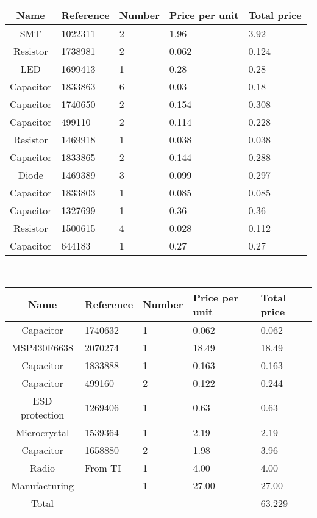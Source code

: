 \begin{tabular}{| c |l | l | l | l |} 
	\hline
		Name & Reference & Number & Price per unit & Total price\\ \hline
		SMT & 1022311 & 2 & 1.96 & 3.92\\ \hline
		Resistor & 1738981 & 2 & 0.062 & 0.124\\ \hline
		LED & 1699413 & 1 & 0.28 & 0.28\\ \hline
		Capacitor & 1833863 & 6 & 0.03 & 0.18\\ \hline
		Capacitor & 1740650 & 2 & 0.154 & 0.308\\ \hline
		Capacitor & 499110 & 2 & 0.114 & 0.228\\ \hline
		Resistor & 1469918 & 1 & 0.038 & 0.038\\ \hline
		Capacitor & 1833865 & 2 & 0.144 & 0.288\\ \hline
		Diode & 1469389 & 3 & 0.099 & 0.297\\ \hline
	   	Capacitor & 1833803 & 1 & 0.085 & 0.085\\ \hline
 		Capacitor & 1327699 & 1 & 0.36 & 0.36 \\ \hline
  		Resistor & 1500615 & 4 & 0.028 & 0.112\\ \hline
	 	Capacitor & 644183 & 1 & 0.27 & 0.27 \\ \hline
\end{tabular}\\
\begin{tabular}{| c |l | l | l | l |} 
		\hline
		Name & Reference & Number & Price per unit & Total price\\ \hline
	 	Capacitor & 1740632 & 1 & 0.062 & 0.062\\ \hline
	 	MSP430F6638 & 2070274 & 1 & 18.49 & 18.49\\ \hline
	 	Capacitor & 1833888 & 1 & 0.163 & 0.163\\ \hline
	 	Capacitor & 499160 & 2 & 0.122 & 0.244\\ \hline
	 	ESD protection & 1269406 & 1 & 0.63 & 0.63\\ \hline
	 	Microcrystal & 1539364 & 1 & 2.19 & 2.19\\ \hline
	 	Capacitor & 1658880 & 2 & 1.98 & 3.96\\ \hline
	 	Radio & From TI & 1 & 4.00 & 4.00\\ \hline
		Manufacturing & & 1 & 27.00 & 27.00\\ \hline
	 	Total &  &  &  & 63.229\\ \hline
\end{tabular}\\

